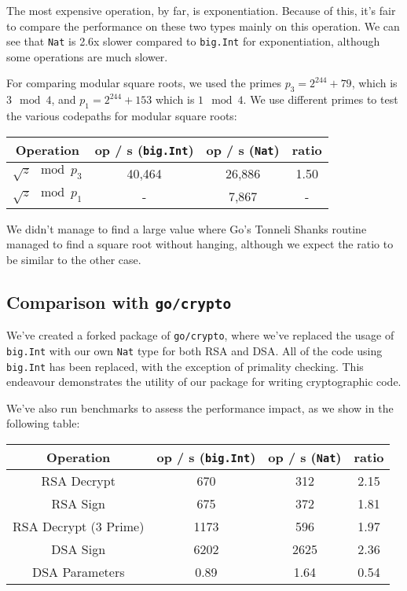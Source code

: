 \documentclass[11pt, a4paper]{article} %
\begin{document}
{The most expensive operation, by far, is exponentiation. Because
of this, it's fair to compare the performance on these two types
mainly on this operation. We can see that \texttt{Nat} is 2.6x slower
compared to \texttt{big.Int} for exponentiation, although
some operations are much slower.

For comparing modular square roots, we used the primes
$p_3 = 2^{244} + 79$, which is $3 \mod 4$,
and $p_1 = 2^{244} + 153$ which is $1 \mod 4$. We use different primes
to test the various codepaths for modular square roots:

\begin{center}
 \begin{tabular}{|c | c | c | c|} 
 \hline
 Operation & op / s (\texttt{big.Int}) & op / s (\texttt{Nat}) & ratio \\ [0.5ex] 
 \hline\hline
 $\sqrt{z} \mod p_3$ & 40,464 & 26,886 & 1.50 \\
 \hline
 $\sqrt{z} \mod p_1$ & - & 7,867 & - \\
 \hline
\end{tabular}
\end{center}

We didn't manage to find a large value where Go's Tonneli Shanks routine
managed to find a square root without hanging, although we
expect the ratio to be similar to the other case.

\subsection{Comparison with \texttt{go/crypto}}

We've created a forked package
\cite{meier_cronokirbyctcrypto_2021}
of \texttt{go/crypto}, where we've replaced the usage of \texttt{big.Int}
with our own \texttt{Nat} type for both RSA and DSA. All of the code
using \texttt{big.Int} has been replaced, with the exception of
primality checking. This endeavour demonstrates the utility of
our package for writing cryptographic code.

We've also run benchmarks to assess the performance impact, as we
show in the following table:

\begin{center}
 \begin{tabular}{|c | c | c | c|} 
 \hline
 Operation & op / s (\texttt{big.Int}) & op / s (\texttt{Nat}) & ratio \\ [0.5ex] 
 \hline\hline
 RSA Decrypt & 670 & 312 & 2.15 \\
 \hline
 RSA Sign & 675 & 372 & 1.81 \\
 \hline
 RSA Decrypt (3 Prime) & 1173 & 596 & 1.97 \\
 \hline
 DSA Sign & 6202 & 2625 & 2.36 \\
 \hline
 DSA Parameters & 0.89 & 1.64 & 0.54 \\
 \hline
\end{tabular}
\end{center}

}
\end{document}
